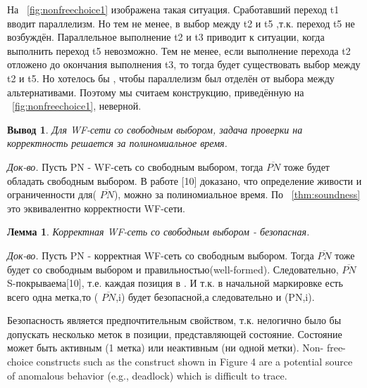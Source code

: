 \documentclass[koi8-r,usehyperref,12pt]{G7-32}
\newtheorem{lemma}{Лемма}
\newtheorem{corollary}{Вывод}
\begin{document}
На ~\cref{fig:nonfreechoice1} изображена такая ситуация. Сработавший переход t1 вводит параллелизм. Но тем не менее, в выбор между t2 и t5 ,т.к. переход t5 не возбуждён. Параллельное выполнение t2 и t3 приводит к ситуации, когда выполнить переход t5 невозможно. Тем не менее, если выполнение перехода t2 отложено до окончания выполнения t3, то тогда будет существовать выбор между t2 и t5. Но хотелось бы , чтобы параллелизм был отделён от выбора между альтернативами. Поэтому мы считаем конструкцию, приведённую на ~\cref{fig:nonfreechoice1}, неверной.



\begin{corollary}\label{crl:freechoicesoundness}
Для WF-сети со свободным выбором, задача проверки на корректность решается за полиномиальное время. 
\end{corollary}
\textit{Док-во.} Пусть PN - WF-сеть со свободным выбором, тогда $\overline{PN}$ тоже будет обладать  свободным выбором.  В работе [10] доказано, что определение живости и ограниченности для( $\overline{PN}$), можно за полиномиальное время. По ~\cref{thm:soundness} это эквивалентно корректности WF-сети.


\begin{lemma}
Корректная WF-сеть со свободным выбором - безопасная.
\end{lemma}
\textit{Док-во.} Пусть PN - корректная WF-сеть со свободным выбором. Тогда $\overline{PN}$ тоже будет со свободным выбором и правильностью(well-formed). Следовательно, $\overline{PN}$ S-покрываема[10], т.е. каждая позиция в . И т.к. в начальной маркировке есть всего одна метка,то ( $\overline{PN}$,i) будет безопасной,а следовательно и (PN,i).



Безопасность является предпочтительным свойством, т.к. нелогично было бы допускать несколько меток в позиции, представляющей состояние. Состояние может быть активным (1 метка) или неактивным (ни одной метки). 
 Non-
free-choice constructs such as the construct shown in Figure 4 are a potential source of
anomalous behavior (e.g., deadlock) which is difficult to trace.
\end{document}
